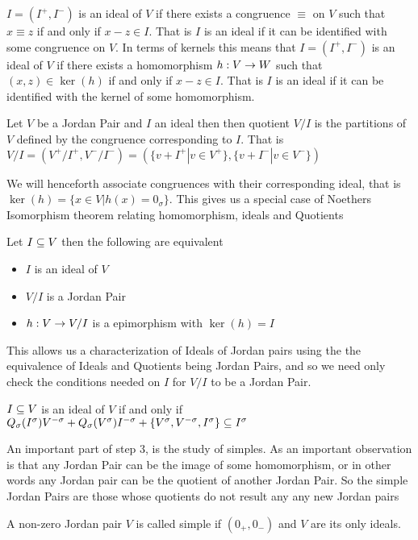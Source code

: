 \begin{definition}
    $I=(I^+,I^-)$ is an ideal of $V$ if there exists a congruence $\equiv$ on $V$ 
    such that $x\equiv z$ if and only if $x-z\in I$. That is $I$ is an ideal if it 
    can be identified with some congruence on $V$. 
    In terms of kernels this means that 
    $I=(I^+,I^-)$ is an ideal of $V$ if there exists a homomorphism $h: V\rightarrow W$ 
    such that $(x,z)\in \ker(h)$ if and only if $x-z\in I$. That is $I$ is an ideal if it 
    can be identified with the kernel of some homomorphism. 
\end{definition}
\begin{definition}
    Let $V$ be a Jordan Pair and $I$ an ideal then then quotient 
    $V/I$ is the partitions of $V$ defined by the congruence 
    corresponding to $I$. That is $V/I=(V^+/I^+,V^-/I^-)=(\{v+I^+|v\in V^+\},\{v+I^-|v\in V^-\})$
\end{definition}
We will henceforth associate congruences with their corresponding ideal, that is $\ker(h)=\{x\in V | h(x)=0_\sigma\}$.
This gives us a special case of Noethers Isomorphism theorem 
relating homomorphism, ideals and Quotients 
\begin{prop}
    Let $I\subseteq V$ then the following are equivalent
    \begin{itemize}
    \item $I$ is an ideal of $V$
    \item $V/I$ is a Jordan Pair
    \item $h:V\rightarrow V/I$ is a epimorphism with $\ker(h)=I$
    \end{itemize}
\end{prop}
This allows us a characterization of Ideals of Jordan pairs using the the equivalence of Ideals and Quotients being Jordan Pairs, and so we need only check the conditions needed on $I$ for $V/I$ to be a Jordan Pair.
\begin{prop}
$I\subseteq V$ is an ideal of $V$ if and only if $Q_\sigma(I^\sigma)V^{-\sigma}+Q_\sigma(V^\sigma)I^{-\sigma}+\{V^\sigma,V^{-\sigma},I^\sigma\}\subseteq I^\sigma$
\end{prop}
An important part of step 3, is the study of simples. As an important observation is that any Jordan Pair can be the image of some homomorphism, 
or in other words any Jordan pair can be the quotient of another Jordan Pair. So the simple Jordan Pairs are those whose quotients do not result any any new Jordan pairs
\begin{definition}
    A non-zero Jordan pair $V$ is called simple if $(0_+,0_-)$ and $V$ are its only ideals.
\end{definition}

